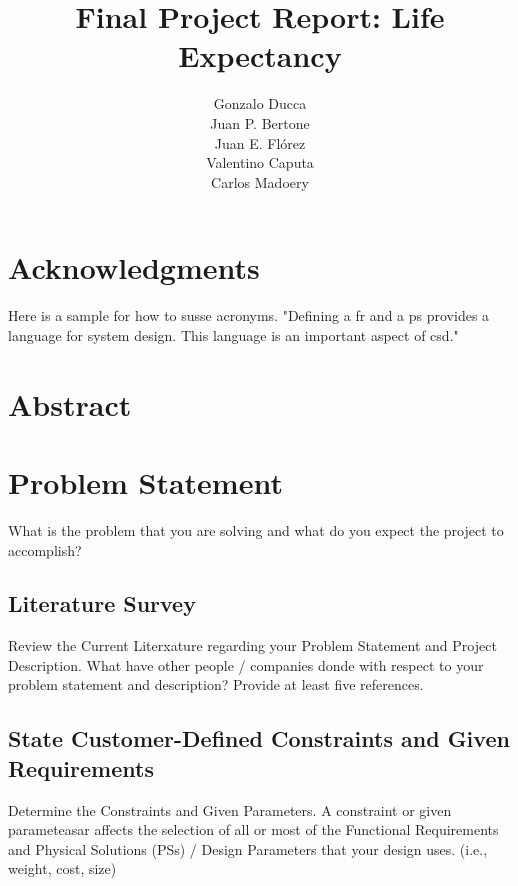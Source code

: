 \documentclass{other/docTemplate}
\author{Gonzalo Ducca\formatemail{gonzaloducca@gmail.com} \\ Juan P. Bertone\formatemail{bertonejpb@gmail.com} \\ Juan E. Flórez\formatemail{juan.florez@upr.edu} \\ Valentino Caputa\formatemail{caputavalentino@gmail.com} \\ Carlos Madoery\formatemail{ccmadoery@gmail.com}}
\title{Final Project Report: Life Expectancy}
\begin{document}
 
\maketitle

\startTable
{}
\stopTable

\tableofcontents
\listoftables
\listoffigures
\printglossary[title=List of Acronyms ,type=\acronymtype]
\clearpage

\section*{Acknowledgments}

Here is a sample for how to susse acronyms. "Defining a \gls{fr} and a \gls{ps} provides a language for system design. This language is an important aspect of \gls{csd}."
\newpage

\section*{Abstract}
\newpage

\section{Problem Statement}
What is the problem that you are solving and what do you expect the project to accomplish?

\subsection{Literature Survey}
Review the Current Literxature regarding your Problem Statement and Project Description. 
What have other people / companies donde with respect to your problem statement and description? Provide at least five references.


\subsection{State Customer-Defined Constraints and Given Requirements}
Determine the Constraints and Given Parameters.
A constraint or given parameteasar affects the selection of all or most of the Functional Requirements and Physical Solutions (PSs) / Design Parameters that your design uses. (i.e., weight, cost, size)
\end{document}
